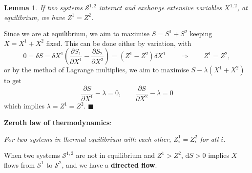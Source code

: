 \documentclass[letter-paper]{tufte-book}
\newtheorem{lemma}[theorem]{\color{pastel-blue}Lemma}
\newenvironment{proof}[1][Proof]{\begin{trivlist}
\item[\hskip \labelsep {\bfseries #1}]}{\end{trivlist}}
\newcommand\Def[1]{\textbf{#1}}
\newcommand{\qed}{\hfill$\blacksquare$}
\begin{document}
\begin{lemma}
If two systems $\mathcal{S}^{1,2}$ interact and exchange extensive variables
$X^{1,2}$, at equilibrium, we have $Z^1 = Z^2$.
\end{lemma}
\begin{proof}
Since we are at equilibrium, we aim to maximise $S = S^1 + S^2$ keeping $X = X^1
+ X^2$ fixed. This can be done either by variation, with
\begin{equation*}
  0 = \delta S = \delta X^1 \left(\frac{\partial S_1}{\partial X^1} - \frac{\partial S_2}{\partial X^2}\right) = (Z^1 - Z^2) \delta X^1 \qquad \Rightarrow \qquad Z^1 = Z^2,
\end{equation*}
or by the method of Lagrange multiplies, we aim to maximise $S - \lambda(X^1 +
X^2)$ to get
\begin{equation*}
  \frac{\partial S}{\partial X^1} - \lambda = 0, \qquad \frac{\partial S}{\partial X^2} - \lambda = 0
\end{equation*}
which implies $\lambda = Z^1 = Z^2$.
\qed
\end{proof}

\vspace*{3mm}

\Def{Zeroth law of thermodynamics}:

\begin{center}\textit{For two systems in thermal equilibrium with each other,
$Z^1_i = Z^2_i$ for all $i$.}\end{center}

When two systems $\mathcal{S}^{1,2}$ are not in equilibrium and $Z^1 > Z^2$,
$\mathrm{d}S > 0$ implies $X$ flows from $\mathcal{S}^1$ to $\mathcal{S}^2$, and
we have a \Def{directed flow}.
\end{document}

